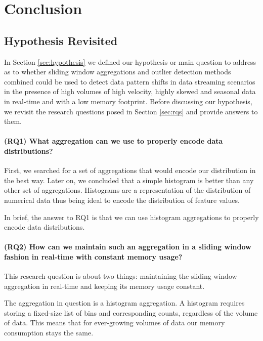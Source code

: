 \chapter{Conclusion} \label{chap:conclusion} \minitoc

\section{Hypothesis Revisited}

In Section \ref{sec:hypothesis} we defined our hypothesis or main question to address as to whether sliding window aggregations and outlier detection methods combined could be used to detect data pattern shifts in data streaming scenarios in the presence of high volumes of high velocity, highly skewed and seasonal data in real-time and with a low memory footprint. Before discussing our hypothesis, we revisit the research questions posed in Section \ref{sec:rqs} and provide answers to them. 

\subsubsection*{(RQ1) What aggregation can we use to properly encode data distributions?}
First, we searched for a set of aggregations that would encode our distribution in the best way. Later on, we concluded that a simple histogram is better than any other set of aggregations. Histograms are a representation of the distribution of numerical data thus being ideal to encode the distribution of feature values. 

In brief, the answer to RQ1 is that we can use histogram aggregations to properly encode data distributions.

\subsubsection*{(RQ2) How can we maintain such an aggregation in a sliding window fashion in real-time with constant memory usage?}

This research question is about two things: maintaining the sliding window aggregation in real-time and keeping its memory usage constant.

The aggregation in question is a histogram aggregation.
A histogram requires storing a fixed-size list of bins and corresponding counts, regardless of the volume of data. This means that for ever-growing volumes of data our memory consumption stays the same.


